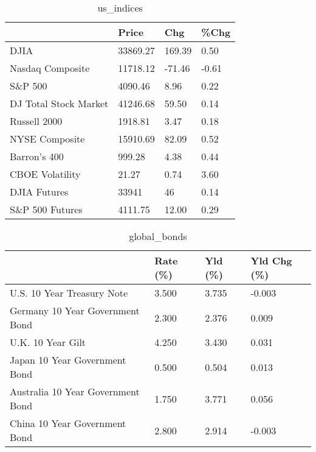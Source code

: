 \documentclass{article}%
\begin{document}
%


\begin{table}[htbp]%
\caption{us\_indices}%
\centering%
\begin{adjustbox}{width=1\textwidth}%
\begin{tabular}{llll}
\toprule
                      &    Price &    Chg &  \%Chg \\
\midrule
                 DJIA & 33869.27 & 169.39 &  0.50 \\
     Nasdaq Composite & 11718.12 & -71.46 & -0.61 \\
              S\&P 500 &  4090.46 &   8.96 &  0.22 \\
DJ Total Stock Market & 41246.68 &  59.50 &  0.14 \\
         Russell 2000 &  1918.81 &   3.47 &  0.18 \\
       NYSE Composite & 15910.69 &  82.09 &  0.52 \\
         Barron's 400 &   999.28 &   4.38 &  0.44 \\
      CBOE Volatility &    21.27 &   0.74 &  3.60 \\
         DJIA Futures &    33941 &     46 &  0.14 \\
      S\&P 500 Futures &  4111.75 &  12.00 &  0.29 \\
\bottomrule
\end{tabular}
%
\end{adjustbox}%
\end{table}

%


\begin{table}[htbp]%
\caption{global\_bonds}%
\centering%
\begin{adjustbox}{width=1\textwidth}%
\begin{tabular}{llll}
\toprule
                                  & Rate (\%) & Yld (\%) & Yld Chg (\%) \\
\midrule
       U.S. 10 Year Treasury Note &    3.500 &   3.735 &      -0.003 \\
  Germany 10 Year Government Bond &    2.300 &   2.376 &       0.009 \\
                U.K. 10 Year Gilt &    4.250 &   3.430 &       0.031 \\
    Japan 10 Year Government Bond &    0.500 &   0.504 &       0.013 \\
Australia 10 Year Government Bond &    1.750 &   3.771 &       0.056 \\
    China 10 Year Government Bond &    2.800 &   2.914 &      -0.003 \\
\bottomrule
\end{tabular}
%
\end{adjustbox}%
\end{table}
\end{document}
